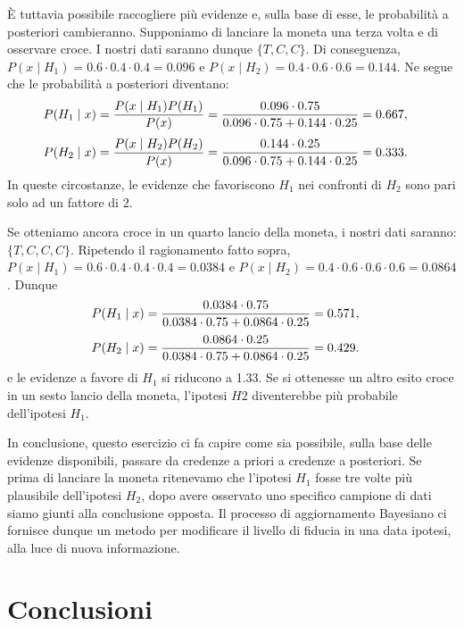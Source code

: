 È tuttavia possibile raccogliere più evidenze e, sulla base di esse, le probabilità a posteriori cambieranno. 
Supponiamo di lanciare la moneta una terza volta e di osservare croce. 
I nostri dati saranno dunque $\{T, C, C\}$. 
Di conseguenza, 
$P(x \mid H_1) = 0.6 \cdot 0.4 \cdot 0.4 = 0.096$ e 
$P(x \mid H_2) = 0.4 \cdot 0.6 \cdot 0.6 = 0.144$. 
Ne segue che le probabilità a posteriori diventano:
\begin{align}
P(H_1 \mid x) &= \frac{P(x \mid H_1) P(H_1)}{P(x)} = \frac{0.096 \cdot 0.75}{0.096 \cdot 0.75 + 0.144 \cdot 0.25} = 0.667,\notag
\end{align}
\begin{align}
P(H_2 \mid x) &= \frac{P(x \mid H_2) P(H_2)}{P(x)} = \frac{0.144 \cdot 0.25}{0.096 \cdot 0.75 + 0.144 \cdot 0.25} = 0.333.\notag
\end{align}
In queste circostanze, le evidenze che favoriscono $H_1$ nei confronti di $H_2$ sono pari solo ad un fattore di 2.

Se otteniamo ancora croce in un quarto lancio della moneta, i nostri dati saranno: $\{T, C, C, C\}$.
Ripetendo il ragionamento fatto sopra, $P(x \mid H_1) = 0.6 \cdot 0.4 \cdot 0.4 \cdot 0.4 = 0.0384$ e 
$P(x \mid H_2) = 0.4 \cdot 0.6 \cdot 0.6 \cdot 0.6 = 0.0864$. 
Dunque
\begin{align}
P(H_1 \mid x) &= \frac{0.0384 \cdot 0.75}{0.0384 \cdot 0.75 + 0.0864 \cdot 0.25} = 0.571,\notag
\end{align}
\begin{align}
P(H_2 \mid x) &= \frac{0.0864 \cdot 0.25}{0.0384 \cdot 0.75 + 0.0864 \cdot 0.25} = 0.429.\notag
\end{align}
e le evidenze a favore di $H_1$ si riducono a 1.33. 
Se si ottenesse un altro esito croce in un sesto lancio della moneta, l'ipotesi $H2$ diventerebbe più probabile dell'ipotesi $H_1$.

In conclusione, questo esercizio ci fa capire come sia possibile, sulla base delle evidenze disponibili, passare da credenze a priori a credenze a posteriori.
Se prima di lanciare la moneta ritenevamo che l'ipotesi $H_1$ fosse tre volte più plausibile dell'ipotesi $H_2$, dopo avere osservato uno specifico campione di dati siamo giunti alla conclusione opposta.
Il processo di aggiornamento Bayesiano ci fornisce dunque un metodo per modificare il livello di fiducia in una data ipotesi, alla luce di nuova informazione. 


\section*{Conclusioni}

